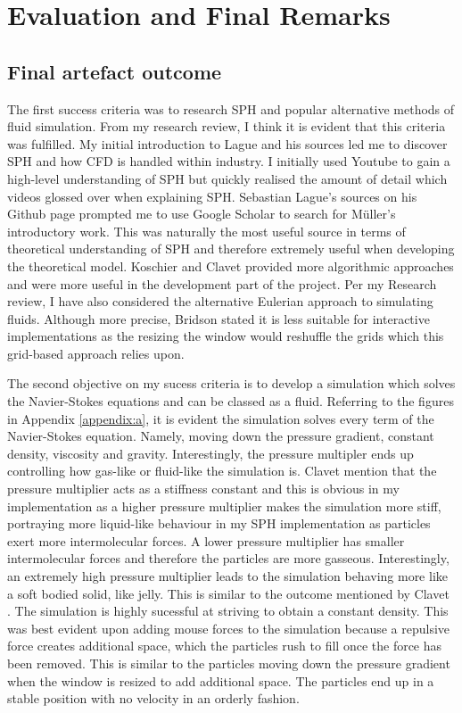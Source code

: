 \documentclass[write-up.tex]{subfiles}
\begin{document}
 \section{Evaluation and Final Remarks}
 \subsection{Final artefact outcome}
The first success criteria was to research SPH and popular alternative methods of fluid simulation. From my research review, I think it is evident that this criteria was fulfilled. My initial introduction to Lague \cite{Lague} and his sources led me to discover SPH and how CFD is handled within industry. I initially used Youtube to gain a high-level understanding of SPH but quickly realised the amount of detail which videos glossed over when explaining SPH. Sebastian Lague's sources on his Github page prompted me to use Google Scholar to search for Müller's \cite{muller} introductory work. This was naturally the most useful source in terms of theoretical understanding of SPH and therefore extremely useful when developing the theoretical model. Koschier \cite{koschier} and Clavet \cite{clavet} provided more algorithmic approaches and were more useful in the development part of the project. Per my Research review, I have also considered the alternative Eulerian approach to simulating fluids. Although more precise, Bridson \cite{bridson} stated it is less suitable for interactive implementations as the resizing the window would reshuffle the grids which this grid-based approach relies upon.

The second objective on my sucess criteria is to develop a simulation which solves the Navier-Stokes equations and can be classed as a fluid. Referring to the figures in  Appendix \ref{appendix:a}, it is evident the simulation solves every term of the Navier-Stokes equation. Namely, moving down the pressure gradient, constant density, viscosity and gravity. Interestingly, the pressure multipler ends up controlling how gas-like or fluid-like the simulation is. Clavet \cite{clavet} mention that the pressure multiplier acts as a stiffness constant and this is obvious in my implementation as a higher pressure multiplier makes the simulation more stiff, portraying more liquid-like behaviour in my SPH implementation as particles exert more intermolecular forces. A lower pressure multiplier has smaller intermolecular forces and therefore the particles are more gasseous. Interestingly, an extremely high pressure multiplier leads to the simulation behaving more like a soft bodied solid, like jelly. This is similar to the outcome mentioned by Clavet \cite{clavet}. The simulation is highly sucessful at striving to obtain a constant density. This was best evident upon adding mouse forces to the simulation because a repulsive force creates additional space, which the particles rush to fill once the force has been removed. This is similar to the particles moving down the pressure gradient when the window is resized to add additional space. The particles end up in a stable position with no velocity in an orderly fashion.
\end{document}
